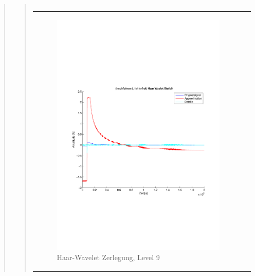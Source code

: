 \begin{quote}
\begin{quote}
\begin{center}
\begin{tabular}{ll}
                \end{tabular}
                \end{center}
    
                
                
        \begin{center}
                \begin{tabular}{ll}
    
                \hspace{-8em}
                    \begin{minipage}{0.6\textwidth}
    
                        \begin{figure}[H]
                            \label{fig:}
                            \includegraphics[scale=0.4, trim = 2cm 6cm 1cm
                            7.5cm,
                            clip]{./Bilder/Termin8/fehlerfrei_hochlaufen_Haar_Wavlet_lvl_9}
                            \caption{Haar-Wavelet Zerlegung, Level 9}
                        \end{figure}
    

\end{minipage}
\end{tabular}
\end{center}
\end{quote}
\end{quote}
